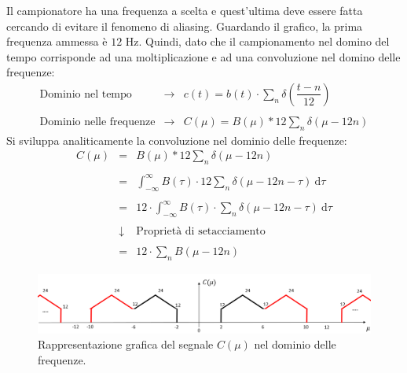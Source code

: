 \documentclass[a4paper]{article}
\begin{document}
	Il campionatore ha una frequenza a scelta e quest'ultima deve essere fatta cercando di evitare il fenomeno di aliasing. Guardando il grafico, la prima frequenza ammessa è $12$ Hz. Quindi, dato che il campionamento nel domino del tempo corrisponde ad una moltiplicazione e ad una convoluzione nel domino delle frequenze:
	\begin{equation*}
		\begin{array}{lll}
			\text{Dominio nel tempo} 		& \longrightarrow & c\left(t\right) = b\left(t\right) \cdot \displaystyle\sum_{n} \delta\left(\dfrac{t - n}{12}\right) \\
			\\
			\text{Dominio nelle frequenze} 	& \longrightarrow & C\left(\mu\right) = B\left(\mu\right) * 12\displaystyle\sum_{n} \delta\left(\mu-12n\right)
		\end{array}
	\end{equation*}
	Si sviluppa analiticamente la convoluzione nel dominio delle frequenze:
	\begin{equation*}
		\begin{array}{lll}
			C\left(\mu\right) & = & B\left(\mu\right) * 12\displaystyle\sum_{n} \delta\left(\mu-12n\right) \\
			\\
			& = & \displaystyle\int_{-\infty}^{\infty} B\left(\tau\right) \cdot 12\displaystyle\sum_{n} \delta\left(\mu-12n-\tau\right) \: \mathrm{d}\tau \\
			\\
			& = & 12 \cdot \displaystyle\int_{-\infty}^{\infty} B\left(\tau\right) \cdot \displaystyle\sum_{n} \delta\left(\mu-12n-\tau\right) \: \mathrm{d}\tau \\
			\\
			& \downarrow & \text{Proprietà di setacciamento} \\
			\\
			& = & 12 \cdot \displaystyle\sum_{n} B\left(\mu-12n\right)
		\end{array}
	\end{equation*}
	\begin{figure}[!htp]
		\centering
		\includegraphics[width=\textwidth]{img/fig_3.png}
		\caption*{Rappresentazione grafica del segnale $C\left(\mu\right)$ nel dominio delle frequenze.}
	\end{figure}\newpage
\end{document}
